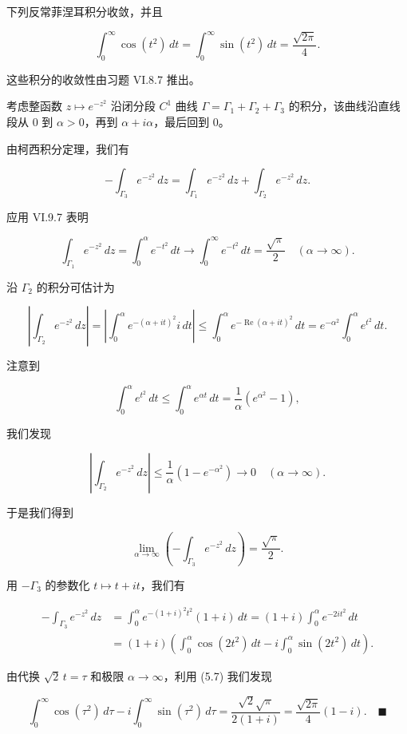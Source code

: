 \begin{proposition}

下列反常菲涅耳积分收敛，并且

\[
\int_{0}^{\infty}\cos(t^{2})\,dt = \int_{0}^{\infty}\sin(t^{2})\,dt = \frac{\sqrt{2\pi}}{4} .
\]

\proofhead
这些积分的收敛性由习题 VI.8.7 推出。

考虑整函数 $ z \mapsto e^{-z^{2}} $ 沿闭分段 $ C^{1} $ 曲线 $ \Gamma = \Gamma_{1} + \Gamma_{2} + \Gamma_{3} $ 的积分，该曲线沿直线段从 0 到 $ \alpha > 0 $，再到 $ \alpha + i\alpha $，最后回到 0。

由柯西积分定理，我们有

\[
-\int_{\Gamma_{3}}e^{-z^{2}}\,dz = \int_{\Gamma_{1}}e^{-z^{2}}\,dz + \int_{\Gamma_{2}}e^{-z^{2}}\,dz .
\]

应用 VI.9.7 表明

\[
\int_{\Gamma_{1}}e^{-z^{2}}\,dz = \int_{0}^{\alpha}e^{-t^{2}}\,dt \to \int_{0}^{\infty}e^{-t^{2}}\,dt = \frac{\sqrt{\pi}}{2} \quad (\alpha \to \infty) .
\]

沿 $ \Gamma_{2} $ 的积分可估计为

\[
\left|\int_{\Gamma_{2}}e^{-z^{2}}\,dz\right| = \left|\int_{0}^{\alpha}e^{-(\alpha + it)^{2}}i\,dt\right| \le \int_{0}^{\alpha}e^{-\operatorname{Re}(\alpha + it)^{2}}\,dt = e^{-\alpha^{2}}\int_{0}^{\alpha}e^{t^{2}}\,dt .
\]

注意到

\[
\int_{0}^{\alpha}e^{t^{2}}\,dt \le \int_{0}^{\alpha}e^{\alpha t}\,dt = \frac{1}{\alpha}(e^{\alpha^{2}} - 1) ,
\]

我们发现

\[
\left|\int_{\Gamma_{2}}e^{-z^{2}}\,dz\right| \le \frac{1}{\alpha}(1 - e^{-\alpha^{2}}) \to 0 \quad (\alpha \to \infty) .
\]

于是我们得到

\begin{equation}
\lim_{\alpha\to\infty}\left(-\int_{\Gamma_{3}}e^{-z^{2}}\,dz\right) = \frac{\sqrt{\pi}}{2} .\tag{5.7}
\end{equation}

用 $ -\Gamma_{3} $ 的参数化 $ t \mapsto t + it $，我们有

\begin{equation*}
\begin{aligned}
-\int_{\Gamma_{3}}e^{-z^{2}}\,dz &= \int_{0}^{\alpha}e^{-(1+i)^{2}t^{2}}(1+i)\,dt = (1+i)\int_{0}^{\alpha}e^{-2it^{2}}\,dt \\ &= (1+i)\left(\int_{0}^{\alpha}\cos(2t^{2})\,dt - i\int_{0}^{\alpha}\sin(2t^{2})\,dt\right) .
\end{aligned}
\end{equation*}

由代换 $ \sqrt{2}\,t = \tau $ 和极限 $ \alpha \to \infty $，利用 (5.7) 我们发现

\[
\int_{0}^{\infty}\cos(\tau^{2})\,d\tau - i\int_{0}^{\infty}\sin(\tau^{2})\,d\tau = \frac{\sqrt{2}\sqrt{\pi}}{2(1+i)} = \frac{\sqrt{2\pi}}{4}(1 - i) .\quad\blacksquare
\]
\end{proposition}

